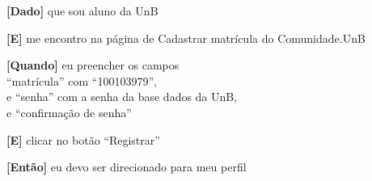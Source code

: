 \begin{description}
\begin{enumerate}
\textbf{[Dado]} que sou aluno da UnB

\textbf{[E]} me encontro na página de Cadastrar matrícula do Comunidade.UnB

\textbf{[Quando]} eu preencher os campos \\
``matrícula'' com ``100103979'',\\
e ``senha''  com a senha da base dados da UnB,\\
e ``confirmação de senha''

\textbf{[E]} clicar no botão ``Registrar''

\textbf{[Então]} eu devo ser direcionado para meu perfil
\end{enumerate}

\end{description}